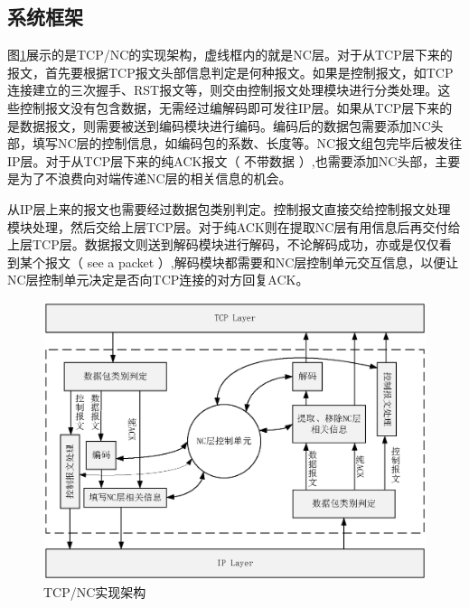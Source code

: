 \subsection{系统框架}
图\ref{JIAGOU_EPS}展示的是TCP/NC的实现架构，虚线框内的就是NC层。对于从TCP层下来的报文，首先要根据TCP报文头部信息判定是何种报文。如果是控制报文，如TCP连接建立的三次握手、RST报文等，则交由控制报文处理模块进行分类处理。这些控制报文没有包含数据，无需经过编解码即可发往IP层。如果从TCP层下来的是数据报文，则需要被送到编码模块进行编码。编码后的数据包需要添加NC头部，填写NC层的控制信息，如编码包的系数、长度等。NC报文组包完毕后被发往IP层。对于从TCP层下来的纯ACK报文（ 不带数据 ）,也需要添加NC头部，主要是为了不浪费向对端传递NC层的相关信息的机会。
\par
从IP层上来的报文也需要经过数据包类别判定。控制报文直接交给控制报文处理模块处理，然后交给上层TCP层。对于纯ACK则在提取NC层有用信息后再交付给上层TCP层。数据报文则送到解码模块进行解码，不论解码成功，亦或是仅仅看到某个报文（ see a packet ）,解码模块都需要和NC层控制单元交互信息，以便让NC层控制单元决定是否向TCP连接的对方回复ACK。
\begin{figure}[htbp]
	\centering
	\includegraphics[width=5in]{figures/jiagou.eps}
	\caption{TCP/NC实现架构}
	\label{JIAGOU_EPS}
\end{figure}

